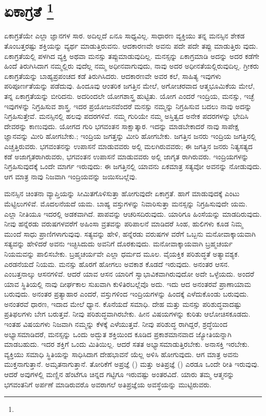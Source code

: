 
\chapter[ಏಕಾಗ್ರತೆ ]{ಏಕಾಗ್ರತೆ \protect\footnote{}}

ಏಕಾಗ್ರತೆಯೇ ಎಲ್ಲಾ ಜ್ಞಾನಗಳ ಸಾರ. ಅದಿಲ್ಲದೆ ಏನೂ ಸಾಧ್ಯವಿಲ್ಲ. ಸಾಧಾರಣ ವ್ಯಕ್ತಿಯು ತನ್ನ ಮನಸ್ಸಿನ ಶೇಕಡ ತೊಂಬತ್ತರಷ್ಟು ಶಕ್ತಿಯನ್ನು ವ್ಯರ್ಥ ಮಾಡುತ್ತಿರುವನು. ಆದಕಾರಣವೇ ಅವನು ಪದೇ ಪದೇ ತಪ್ಪು ಮಾಡುತ್ತಿರು ವುದು. ಏಕಾಗ್ರತೆಯಲ್ಲಿ ಪಳಗಿದ ವ್ಯಕ್ತಿ ಅಥವಾ ಮನಸ್ಸು ತಪ್ಪುಮಾಡುವುದಿಲ್ಲ. ಮನಸ್ಸನ್ನು ಏಕಾಗ್ರಮಾಡಿ ಅದನ್ನು ಅದರ ಕಡೆಗೇ ಹಿಂದೆ ತಿರುಗಿಸಿದಾಗ ನಮ್ಮಲ್ಲಿರು ವುದೆಲ್ಲ ನಮ್ಮ ಅಧೀನವಾಗುವುದು, ನಾವು ಅದರ ಅಧೀನತೆಯಲ್ಲಿರುವುದಿಲ್ಲ. ಗ್ರೀಕರು ಏಕಾಗ್ರತೆಯನ್ನು ಬಾಹ್ಯಪ್ರಪಂಚದ ಕಡೆ ತಿರುಗಿಸಿದರು. ಆದಕಾರಣವೇ ಅವರ ಕಲೆ, ಸಾಹಿತ್ಯ ಇವುಗಳು ಪರಿಪೂರ್ಣತೆಯನ್ನು ಪಡೆದುವು. ಹಿಂದೂವು ಆಂತರಿಕ ಜಗತ್ತಿನ ಮೇಲೆ, ಅಗೋಚರವಾದ ಆತ್ಮಭೂಮಿಕೆಯ ಮೇಲೆ, ತನ್ನ ಏಕಾಗ್ರತೆಯನ್ನು ಬೀರಿದನು. ಅದರಿಂದಲೇ ಯೋಗಶಾಸ್ತ್ರ ಹುಟ್ಟಿತು. ಯೋಗ ಎಂದರೆ ಇಂದ್ರಿಯ, ಮನಸ್ಸು, ಇಚ್ಛೆ ಇವುಗಳನ್ನು ನಿಗ್ರಹಿಸುವ ಶಾಸ್ತ್ರ. ಇದರ ಪ್ರಯೋಜನವೆಂದರೆ ಮನಸ್ಸು ನಮ್ಮನ್ನು ನಿಗ್ರಹಿಸುವ ಬದಲು ನಾವು ಅದನ್ನು ನಿಗ್ರಹಿಸುತ್ತೇವೆ. ಮನಸ್ಸಿನಲ್ಲಿ ಹಲವು ಪದರಗಳಿವೆ. ನಮ್ಮ ಗುರಿಯೇ ನಮ್ಮ ಅಸ್ತಿತ್ವದ ಅನೇಕ ಪದರಗಳನ್ನು ಭೇದಿಸಿ ದೇವರನ್ನು ಕಾಣುವುದು. ಯೋಗದ ಗುರಿ ಭಗವಂತನ ಸಾಕ್ಷಾತ್ಕಾರ. ಇದನ್ನು ಮಾಡಬೇಕಾದರೆ ನಾವು ಸಾಪೇಕ್ಷ ಜ್ಞಾನವನ್ನು ಮೀರಿ ಹೋಗಬೇಕು.; ಇಂದ್ರಿಯ ಜಗತ್ತನ್ನು ಮೀರಿ ಹೋಗಬೇಕು. ಜಗತ್ತಿನ ಜನರು ಇಂದ್ರಿಯ ಜಗತ್ತಿನಲ್ಲಿ ಎಚ್ಚತ್ತಿರುವರು. ಭಗವಂತನನ್ನು ಉಪಾಸನೆ ಮಾಡುವವರು ಅಲ್ಲಿ ಮಲಗಿರುವವರು; ಈ ಜಗತ್ತಿನ ಜನರು ನಿತ್ಯಸತ್ಯದ ಕಡೆ ಅಜಾಗೃತರಾಗಿರುವರು, ಭಗವಂತನ ಉಪಾಸನೆ ಮಾಡುವವರು ಅಲ್ಲಿ ಜಾಗೃತ ರಾಗಿರುವರು. ಇಂದ್ರಿಯಗಳನ್ನು ನಿಗ್ರಹಿಸುವುದಕ್ಕೆ ಒಂದೇ ಮಾರ್ಗ ಇರುವುದು: ಈ ಜಗತ್ತಿನಲ್ಲಿ ಯಾವನು ಏಕಮಾತ್ರ ಸತ್ಯವೋ ಅವನನ್ನು ನೋಡುವುದು. ಆಗ ಮಾತ್ರ ನಾವು ನಿಜವಾಗಿ ಇಂದ್ರಿಯವನ್ನು ಜಯಿಸಬಲ್ಲೆವು.

ಮನಸ್ಸಿನ ಚಿಂತನಾ ವ್ಯಾಪ್ತಿಯನ್ನು ಸೀಮಿತಗೊಳಿಸುತ್ತಾ ಹೋಗುವುದೇ ಏಕಾಗ್ರತೆ. ಹಾಗೆ ಮಾಡುವುದಕ್ಕೆ ಎಂಟು ಮೆಟ್ಟಿಲುಗಳಿವೆ. ಮೊದಲನೆಯದೆ ಯಮ. ಬಾಹ್ಯ ವಸ್ತುಗಳನ್ನು ನಿವಾರಿಸುತ್ತಾ ಮನಸ್ಸನ್ನು ನಿಗ್ರಹಿಸುವುದೇ ಯಮ. ಎಲ್ಲಾ ನೀತಿಯೂ ಇದರಲ್ಲಿ ಅಡಕವಾಗಿದೆ. ಪಾಪವನ್ನು ಆಚರಿಸದಿರುವುದು. ಯಾರಿಗೂ ಹಿಂಸೆಯನ್ನು ಮಾಡದಿರುವುದು. ನೀವು ಹನ್ನೆರಡು ವರುಷಗಳವರೆಗೆ ಅಹಿಂಸಾ ವ್ರತವನ್ನು ಪರಿಪಾಲನೆ ಮಾಡಿದರೆ ಸಿಂಹ, ಹುಲಿಗಳು ಕೂಡ ನಿಮ್ಮ ಮುಂದೆ ಸಾಧು ಪ್ರಾಣಿಗಳಾಗುವುವು. ಸತ್ಯವನ್ನು ಹೇಳಿ, ಹನ್ನೆರಡು ವರುಷಗಳ ವರೆಗೆ ಒಬ್ಬನು ಮನೋವಾಕ್ಕಾಯವಾಗಿ ಸತ್ಯವನ್ನು ಹೇಳಿದರೆ ಅವನು ಇಚ್ಛಿಸಿದುದು ಅವನಿಗೆ ದೊರಕುವುದು. ಮನೋವಾಕ್ಕಾಯವಾಗಿ ಬ್ರಹ್ಮಚರ್ಯ ನಿಯಮವನ್ನು ಪಾಲಿಸಬೇಕು. ಬ್ರಹ್ಮಚರ್ಯವೇ ಎಲ್ಲಾ ಧರ್ಮದ ಮೂಲ. ವೈಯಕ್ತಿಕ ಪರಿಶುದ್ಧತೆ ಅತ್ಯಾವಶ್ಯಕ. ಎರಡನೆಯದೆ ನಿಯಮ. ಮನಸ್ಸು ಹೊರಗೆ ಹೋಗಲು ಅವಕಾಶ ಕೊಡದೆ ಇರುವುದು. ಅನಂತರ ಆಸನ. ಎಂಬತ್ತನಾಲ್ಕು ಆಸನಗಳಿವೆ. ಆದರೆ ಯಾವ ಆಸನ ಯಾರಿಗೆ ಸ್ವಾಭಾವಿಕವಾಗಿರುವುದೋ ಅದೇ ಒಳ್ಳೆಯದು. ಅಂದರೆ ಯಾವ ಸ್ಥಿತಿಯಲ್ಲಿ ನಾವು ದೀರ್ಘಕಾಲ ಸುಖವಾಗಿ ಕುಳಿತಿರಬಲ್ಲೆವೊ ಅದು. ಇದು ಆದ ಅನಂತರವೆ ಪ್ರಾಣಾಯಾಮ ಬರುವುದು. ಅನಂತರ ಪ್ರತ್ಯಾಹಾರ ಎಂದರೆ, ವಸ್ತುಗಳಿಂದ ಇಂದ್ರಿಯಗಳನ್ನು ಹಿಂದಕ್ಕೆ ಎಳೆದುಕೊಂಡು ಬರುವುದು. ಅನಂತರವೆ ಧಾರಣ, ಇದಾದ ಮೇಲೆ ಧ್ಯಾನ. ಕೊನೆಯದೆ ಸಮಾಧಿ. ದೇಹ ಮತ್ತು ಮನಸ್ಸು ಪರಿಶುದ್ಧವಾದಷ್ಟು ಪ್ರತಿಫಲಗಳು ಬೇಗ ಬರುತ್ತವೆ. ನೀವು ಪರಿಶುದ್ಧವಾಗಿರಬೇಕು. ಹೀನ ವಿಷಯಗಳನ್ನು ಕುರಿತು ಆಲೋಚಿಸಕೂಡದು. ಇಂತಹ ವಿಷಯಗಳು ನಿಜವಾಗಿ ನಮ್ಮನ್ನು ಕೆಳಕ್ಕೆ ಎಳೆಯುತ್ತವೆ. ನೀವು ಪರಿಶುದ್ಧ ರಾಗಿದ್ದರೆ, ಶ್ರದ್ಧೆಯಿಂದ ಅಭ್ಯಾಸಮಾಡಿದರೆ, ಮನಸ್ಸನ್ನು ಒಂದು ಅದ್ಭುತ ಶಕ್ತಿಯಿಂದ ಕೂಡಿದ ಪ್ರಕಾಶಮಾನವಾದ ಜ್ಯೋತಿಯನ್ನಾಗಿ ಮಾಡಬಹುದು. ಇದರ ಶಕ್ತಿಗೆ ಒಂದು ಮಿತಿಯಿಲ್ಲ. ಆದರೆ ಸತತ ಅಭ್ಯಾಸಮಾಡುತ್ತಿರಬೇಕು. ಅನಾಸಕ್ತಿ ಇರಬೇಕು. ವ್ಯಕ್ತಿಯು ಸಮಾಧಿ ಸ್ಥಿತಿಯನ್ನು ಸಾಧಿಸಿದಾಗ ದೇಹಭಾವನೆ ಯೆಲ್ಲ ಅಳಿಸಿ ಹೋಗುವುದು. ಆಗ ಮಾತ್ರ ಅವನು ಮುಕ್ತನಾಗುತ್ತಾನೆ. ಅಮೃತನಾಗುತ್ತಾನೆ. ತೋರಿಕೆಗೆ ಅಪ್ರಜ್ಞೆ () ಮತ್ತು ಅತಿಪ್ರಜ್ಞೆ () ಎರಡೂ ಒಂದೇ ರೀತಿ ಇರುವುವು. ಆದರೆ ಅವುಗಳಲ್ಲಿ ಮಣ್ಣಿನ ಹೆಂಟೆಗೂ ಚಿನ್ನದ ಗಟ್ಟಿಗೂ ಇರುವಷ್ಟು ಅಂತರವಿದೆ. ಯಾರು ತಮ್ಮ ಆತ್ಮನನ್ನು ಭಗವಂತನಿಗೆ ಅರ್ಪಣೆ ಮಾಡಿರುವರೊ ಅವರಾಗಲೆ ಅತಿಪ್ರಜ್ಞೆಯ ಅವಸ್ಥೆಯನ್ನು ಮುಟ್ಟಿರುವರು.

